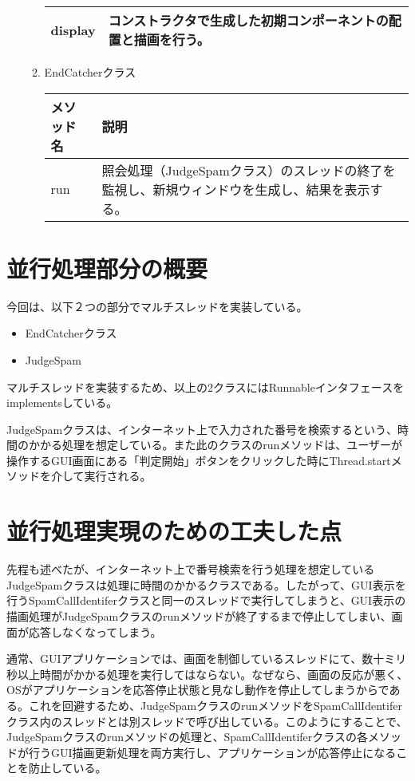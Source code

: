 \documentclass[dvipdfmx, titlepage]{jsarticle}
\begin{document}
\begin{itemize}
\begin{enumerate}
\begin{table}[H]
\begin{tabular}{|l|l|}
display          & コンストラクタで生成した初期コンポーネントの配置と描画を行う。                                       \\ \hline
\end{tabular}
\end{table}
\item EndCatcherクラス
\begin{table}[H]
  \begin{tabular}{|l|l|} \hline
  メソッド名 & 説明                                                  \\ \hline
  run   & 照会処理（JudgeSpamクラス）のスレッドの終了を監視し、新規ウィンドウを生成し、結果を表示する。 \\ \hline
  \end{tabular}
\end{table}
  \end{enumerate}
\end{itemize}
\section{並行処理部分の概要}
今回は、以下２つの部分でマルチスレッドを実装している。
\begin{itemize}
  \item EndCatcherクラス
  \item JudgeSpam
\end{itemize}
マルチスレッドを実装するため、以上の2クラスにはRunnableインタフェースをimplementsしている。\par
JudgeSpamクラスは、インターネット上で入力された番号を検索するという、時間のかかる処理を想定している。また此のクラスのrunメソッドは、ユーザーが操作するGUI画面にある「判定開始」ボタンをクリックした時にThread.startメソッドを介して実行される。\par

\section{並行処理実現のための工夫した点}
先程も述べたが、インターネット上で番号検索を行う処理を想定しているJudgeSpamクラスは処理に時間のかかるクラスである。したがって、GUI表示を行うSpamCallIdentiferクラスと同一のスレッドで実行してしまうと、GUI表示の描画処理がJudgeSpamクラスのrunメソッドが終了するまで停止してしまい、画面が応答しなくなってしまう。\par
通常、GUIアプリケーションでは、画面を制御しているスレッドにて、数十ミリ秒以上時間がかかる処理を実行してはならない。なぜなら、画面の反応が悪く、OSがアプリケーションを応答停止状態と見なし動作を停止してしまうからである。これを回避するため、JudgeSpamクラスのrunメソッドをSpamCallIdentiferクラス内のスレッドとは別スレッドで呼び出している。このようにすることで、JudgeSpamクラスのrunメソッドの処理と、SpamCallIdentiferクラスの各メソッドが行うGUI描画更新処理を両方実行し、アプリケーションが応答停止になることを防止している。
\end{document}
